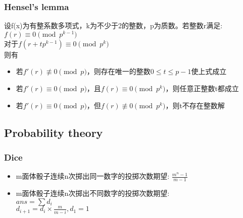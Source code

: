 \subsubsection{Hensel's lemma}
设f(x)为有整系数多项式，k为不少于2的整数，p为质数。若整数r满足:\\
$f(r) \equiv 0 \pmod{p^{k-1}}$\\
对于$f(r+tp^{k-1}) \equiv 0 \pmod{p^k}$\\
则有
\begin{itemize}
\item 若$f'(r)\not\equiv 0\pmod{p}$，则存在唯一的整数$0\le t\le{p-1}$使上式成立
\item 若$f'(r)\equiv 0\pmod{p}$，且$f(r)\equiv 0\pmod{p^k}$，则任意正整数t都成立
\item 若$f'(r)\equiv 0\pmod{p}$，但$f(r)\not\equiv 0\pmod{p^k}$，则t不存在整数解
\end{itemize}
\subsection{Probability theory}
\subsubsection{Dice}
\begin{itemize}
\item m面体骰子连续n次掷出同一数字的投掷次数期望: $\frac{m^n-1}{m-1}$
\item m面体骰子连续n次掷出不同数字的投掷次数期望:\\
$ans=\sum d_i$\\
$d_{i+1}=d_i\times \frac{m}{m-i}, d_1=1$
\end{itemize}


